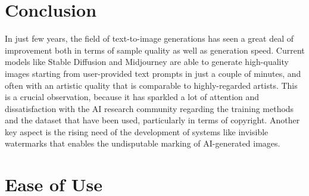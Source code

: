 \documentclass[conference]{IEEEtran}
\begin{document}
\section{Conclusion}
In just few years, the field of text-to-image generations has seen a great deal of improvement both in terms of sample quality as well as generation speed. Current models like Stable Diffusion and Midjourney are able to generate high-quality images starting from user-provided text prompts in just a couple of minutes, and often with an artistic quality that is comparable to highly-regarded artists. This is a crucial observation, because it has sparkled a lot of attention and dissatisfaction with the AI research community regarding the training methods and the dataset that have been used, particularly in terms of copyright. Another key aspect is the rising need of the development of systems like invisible watermarks \cite{invisiblewatermark} that enables the undisputable marking of AI-generated images.

%


\iffalse
\section{Ease of Use}
\end{document}
